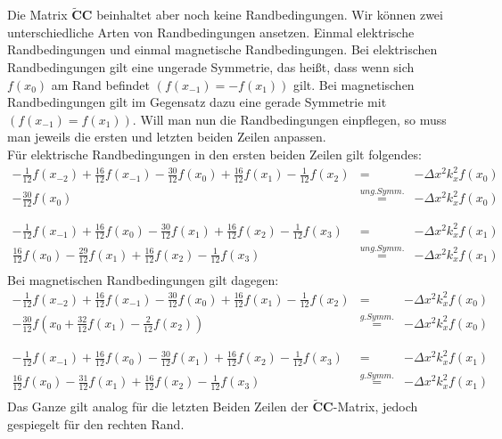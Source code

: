 \documentclass[Protokollheft.tex]{subfiles}
\begin{document}
	Die Matrix $\mathbf{\widetilde{C}C}$ beinhaltet aber noch keine Randbedingungen. Wir können zwei unterschiedliche Arten von Randbedingungen ansetzen. Einmal elektrische Randbedingungen und einmal magnetische Randbedingungen. Bei elektrischen Randbedingungen gilt eine ungerade Symmetrie, das heißt, dass wenn sich $f(x_0)$ am Rand befindet $(f(x_{-1})=-f(x_{1}))$ gilt. Bei magnetischen Randbedingungen gilt im Gegensatz dazu eine gerade Symmetrie mit $(f(x_{-1})=f(x_{1}))$. Will man nun die Randbedingungen einpflegen, so muss man jeweils die ersten und letzten beiden Zeilen anpassen.\\
	Für elektrische Randbedingungen in den ersten beiden Zeilen gilt folgendes:
	\begin{eqnarray*}
		-\frac{1}{12}f(x_{-2})+\frac{16}{12}f(x_{-1})-\frac{30}{12}f(x_0)+\frac{16}{12}f(x_{1})-\frac{1}{12}f(x_{2})&=&-\Delta x^2k^2_xf(x_0)\\
		-\frac{30}{12}f(x_0)&\stackrel{ung. Symm.}{=}&-\Delta x^2k^2_xf(x_0)\\
		\\
		\\
		-\frac{1}{12}f(x_{-1})+\frac{16}{12}f(x_{0})-\frac{30}{12}f(x_1)+\frac{16}{12}f(x_{2})-\frac{1}{12}f(x_{3})&=&-\Delta x^2k^2_xf(x_1)\\
		\frac{16}{12}f(x_{0})-\frac{29}{12}f(x_1)+\frac{16}{12}f(x_{2})-\frac{1}{12}f(x_{3})&\stackrel{ung. Symm.}{=}&-\Delta x^2k^2_xf(x_1)\\
	\end{eqnarray*}
	Bei magnetischen Randbedingungen gilt dagegen:
	\begin{eqnarray*}
		-\frac{1}{12}f(x_{-2})+\frac{16}{12}f(x_{-1})-\frac{30}{12}f(x_0)+\frac{16}{12}f(x_{1})-\frac{1}{12}f(x_{2})&=&-\Delta x^2k^2_xf(x_0)\\
		-\frac{30}{12}f(x_0+\frac{32}{12}f(x_{1})-\frac{2}{12}f(x_{2}))&\stackrel{g. Symm.}{=}&-\Delta x^2k^2_xf(x_0)\\
		\\
		\\
		-\frac{1}{12}f(x_{-1})+\frac{16}{12}f(x_{0})-\frac{30}{12}f(x_1)+\frac{16}{12}f(x_{2})-\frac{1}{12}f(x_{3})&=&-\Delta x^2k^2_xf(x_1)\\
		\frac{16}{12}f(x_{0})-\frac{31}{12}f(x_1)+\frac{16}{12}f(x_{2})-\frac{1}{12}f(x_{3})&\stackrel{g. Symm.}{=}&-\Delta x^2k^2_xf(x_1)\\
	\end{eqnarray*}
	Das Ganze gilt analog für die letzten Beiden Zeilen der $\mathbf{\widetilde{C}C}$-Matrix, jedoch gespiegelt für den rechten Rand.
\end{document}
